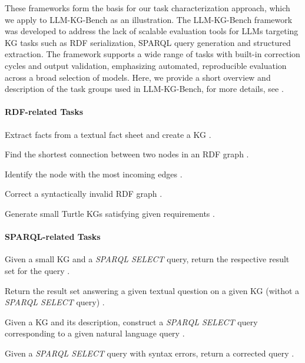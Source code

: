 \documentclass[
]{ceurart}
\newcommand{\lkgb}{LLM-KG-Bench\xspace}
\newcommand{\LKGBf}{LLM-KG-Bench framework\xspace} %
\newcommand{\sparqlselquery}{\emph{SPARQL SELECT} query\xspace}
\begin{document}
These frameworks form the basis for our task characterization approach, which we apply to \lkgb as an illustration. The \LKGBf was developed to address the lack of scalable evaluation tools for LLMs targeting KG tasks such as RDF serialization, SPARQL query generation and structured extraction. The framework supports a wide range of tasks with built-in correction cycles and output validation, emphasizing automated, reproducible evaluation across a broad selection of models. Here, we provide a short overview and description of the task groups used in \lkgb, for more details, see \cite{Meyer2023DevelopingScalableBenchmark,Frey2023Turtle,Frey2024AssessingEvolutionLLM,Meyer2024AssessingSparqlCapabilititesLLM,Meyer2025LLMKGBench3,Meyer2025EvaluatingLLMsForRdf}. 

\paragraph{RDF-related Tasks}

\begin{description}[font=\normalfont\itshape, style=multiline, leftmargin=46mm]
    \item[FactExtractStatic] Extract facts from a textual fact sheet and create a KG
    \cite{Meyer2023DevelopingScalableBenchmark,Frey2023Turtle}.
    \item[RdfConnectionExplainStatic] Find the shortest connection between two nodes in an RDF graph \cite{Frey2023Turtle,Meyer2025LLMKGBench3}.
    \item[RdfFriendCount] Identify the node with the most incoming edges \cite{Frey2023Turtle,Meyer2025LLMKGBench3}.
    \item[RdfSyntaxFixList] Correct a syntactically invalid RDF graph \cite{Meyer2025LLMKGBench3}.
    \item[TurtleSampleGeneration] Generate small Turtle KGs satisfying given requirements \cite{Meyer2023DevelopingScalableBenchmark,Frey2023Turtle}.
\end{description}

\paragraph{SPARQL-related Tasks}
\begin{description}[font=\normalfont\itshape, style=multiline, leftmargin=46mm]
    \item[Sparql2AnswerList] Given a small KG and a \sparqlselquery, return the respective result set for the query \cite{Meyer2024AssessingSparqlCapabilititesLLM}.
    \item[Text2AnswerList] Return the result set answering a given textual question on a given KG (withot a \sparqlselquery) \cite{Meyer2024AssessingSparqlCapabilititesLLM}.
    \item[Text2SparqlList] Given a KG and its description, construct a \sparqlselquery corresponding to a given natural language query \cite{Meyer2024AssessingSparqlCapabilititesLLM}.
    \item[SparqlSyntaxFixingList] Given a \sparqlselquery with syntax errors, return a corrected query \cite{Meyer2024AssessingSparqlCapabilititesLLM}.
\end{description}
\end{document}
